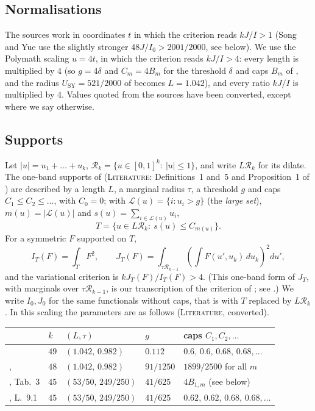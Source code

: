 \documentclass[11pt]{amsart}
\theoremstyle{definition}
\theoremstyle{remark}
\newcommand{\lbl}[1]{\textup{\textsc{#1}}}
\newcommand{\R}{\mathcal{R}}
\begin{document}
\subsection*{Normalisations}
The sources work in coordinates $t$ in which the criterion reads $kJ/I>1$
(Song and Yue use the slightly stronger $48J/I_0>2001/2000$, see below). We
use the Polymath scaling $u=4t$, in which the criterion reads $kJ/I>4$: every
length is multiplied by $4$ (so $g=4\delta$ and $C_m=4B_m$ for the threshold
$\delta$ and caps $B_m$ of \cite{Sta26}, and the radius $U_{\mathrm{SY}}=521/2000$
of \cite{SY26} becomes $L=1.042$), and every ratio $kJ/I$ is multiplied by
$4$. Values quoted from the sources have been converted, except where we say
otherwise.

\subsection*{Supports}
Let
$|u|=u_1+\dots+u_k$, $\R_k=\{u\in[0,1]^k:\ |u|\le1\}$, and write $L\R_k$ for its dilate.
The one-band supports of \cite{Sta26} (\lbl{Literature}: Definitions~1
and~5 and Proposition~1 of \cite{Sta26}) are described by a length $L$, a marginal radius
$\tau$, a threshold $g$ and caps $C_1\le C_2\le\dots$, with $C_0=0$; with
$\mathcal L(u)=\{i:u_i>g\}$ (the \emph{large set}), $m(u)=|\mathcal L(u)|$ and
$s(u)=\sum_{i\in\mathcal L(u)}u_i$,
\[
T=\{u\in L\R_k:\ s(u)\le C_{m(u)}\}.
\]
For a symmetric $F$ supported on $T$,
\[
I_T(F)=\int_TF^2,\qquad
J_T(F)=\int_{\tau\R_{k-1}}\left(\int F(u',u_k)\,du_k\right)^2du',
\]
and the variational criterion is $kJ_T(F)/I_T(F)>4$. (This one-band form of
$J_T$, with marginals over $\tau\R_{k-1}$, is our transcription of the
criterion of \cite[Prop.~1]{Sta26}; see \cite[\S5]{Kim26}.) We write
$I_0,J_0$ for the same functionals without caps, that is with $T$ replaced by
$L\R_k$. In this scaling the parameters are as follows (\lbl{Literature},
converted).
\begin{center}\small
\begin{tabular}{@{}lllll@{}}
\toprule
 & $k$ & $(L,\tau)$ & $g$ & caps $C_1,C_2,\dots$\\
\midrule
\cite{Sta26} & $49$ & $(1.042,\,0.982)$ & $0.112$ & $0.6,\,0.6,\,0.68,\,0.68,\dots$\\
\cite{Kin26}, \cite{SY26} & $48$ & $(1.042,\,0.982)$ & $91/1250$ & $1899/2500$ for all $m$\\
\cite{Cha26}, Tab.~3 & $45$ & $(53/50,\,249/250)$ & $41/625$ & $4B_{1,m}$ (see below)\\
\cite{Cha26}, L.~9.1 & $45$ & $(53/50,\,249/250)$ & $41/625$ & $0.62,\,0.62,\,0.68,\,0.68,\dots$\\
\bottomrule
\end{tabular}
\end{center}
\end{document}
